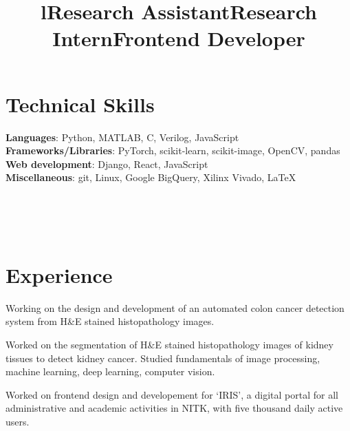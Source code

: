\documentclass[margin]{res}
\begin{document}
\begin{resume}
    \section{Technical Skills}
      \textbf{Languages}: Python, MATLAB, C, Verilog, JavaScript
      \\
      \textbf{Frameworks/Libraries}: PyTorch, scikit-learn, scikit-image, OpenCV, pandas
      \\
      \textbf{Web development}: Django, React, JavaScript
      \\
      \textbf{Miscellaneous}: git, Linux, Google BigQuery, Xilinx Vivado, \LaTeX


    \begin{format}
      \title{l}\\
      \\
      \body\\
    \end{format}

    \section{Experience}
      \title{\textbf{Research Assistant}}
      \begin{position}
        Working on the design and development of an automated colon cancer detection system from H\&E stained histopathology images.
      \end{position}

      \title{\textbf{Research Intern}}
      \begin{position}
        Worked on the segmentation of H\&E stained histopathology images of kidney tissues to detect kidney cancer. Studied fundamentals of image processing, machine learning, deep learning, computer vision.
      \end{position}

      \title{\textbf{Frontend Developer}}
      \begin{position}
        Worked on frontend design and developement for `IRIS', a digital portal for all administrative and academic activities in NITK, with five thousand daily active users.
      \end{position}


\end{resume}
\end{document}

